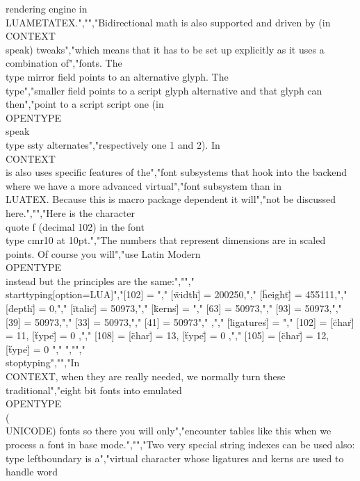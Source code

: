 rendering engine in \\LUAMETATEX.","","Bidirectional math is also supported and driven by (in \\CONTEXT\\ speak) tweaks","which means that it has to be set up explicitly as it uses a combination of","fonts. The \\type {mirror} field points to an alternative glyph. The \\type","{smaller} field points to a script glyph alternative and that glyph can then","point to a script script one (in \\OPENTYPE\\ speak \\type {ssty} alternates","respectively one 1 and 2). In \\CONTEXT\\ is also uses specific features of the","font subsystems that hook into the backend where we have a more advanced virtual","font subsystem than in \\LUATEX. Because this is macro package dependent it will","not be discussed here.","","Here is the character \\quote {f} (decimal 102) in the font \\type {cmr10 at 10pt}.","The numbers that represent dimensions are in scaled points. Of course you will","use Latin Modern \\OPENTYPE\\ instead but the principles are the same:","","\\starttyping[option=LUA]","[102] = {","    [\"width\"]  = 200250,","    [\"height\"] = 455111,","    [\"depth\"]  = 0,","    [\"italic\"] = 50973,","    [\"kerns\"]  = {","        [63] = 50973,","        [93] = 50973,","        [39] = 50973,","        [33] = 50973,","        [41] = 50973","    },","    [\"ligatures\"] = {","        [102] = { [\"char\"] = 11, [\"type\"] = 0 },","        [108] = { [\"char\"] = 13, [\"type\"] = 0 },","        [105] = { [\"char\"] = 12, [\"type\"] = 0 }","    }","}","\\stoptyping","","In \\CONTEXT, when they are really needed, we normally turn these traditional","eight bit fonts into emulated \\OPENTYPE\\ (\\UNICODE) fonts so there you will only","encounter tables like this when we process a font in base mode.","","Two very special string indexes can be used also: \\type {leftboundary} is a","virtual character whose ligatures and kerns are used to handle word 